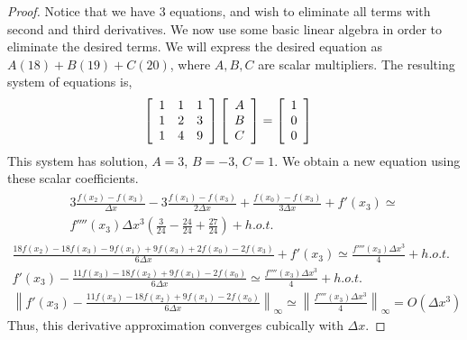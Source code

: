 \documentclass{article}
\begin{document}
\begin{enumerate}
\begin{proof}
        Notice that we have 3 equations, and wish to eliminate all terms with second and third derivatives. We now use some basic linear algebra in order to eliminate the desired terms. We will express the desired equation as $A(18) + B(19) + C(20)$, where $A, B, C$ are scalar multipliers. The resulting system of equations is, 
    \begin{align}
        \left[ \begin{array}{c c c} 1 & 1 & 1 \\ 1 & 2 & 3 \\ 1 & 4 & 9 \end{array} \right] \left[ \begin{array}{c} A  \\ B \\ C\end{array}\right] &= \left[\begin{array}{c} 1 \\ 0 \\ 0\end{array}\right]
    \end{align}
    This system has solution, $A = 3$, $B = -3$, $C = 1$. We obtain a new equation using these scalar coefficients. 
    \begin{align}
        \begin{split}
            3\frac{f(x_2) - f(x_3)}{\Delta x} -3\frac{f(x_1) - f(x_3)}{2\Delta x} +  \frac{f(x_0) - f(x_3)}{3\Delta x} + f'(x_3)  \simeq \\ f''''(x_3)\Delta x^3 \left(\frac{3}{24} -  \frac{24}{24} + \frac{27}{24}\right) + h.o.t. 
        \end{split}
    \end{align}
    \begin{align}
            \frac{18f(x_2) - 18f(x_3) - 9f(x_1) + 9f(x_3) + 2f(x_0) - 2f(x_3)}{6\Delta x} + f'(x_3)  \simeq \frac{f''''(x_3)\Delta x^3}{4} + h.o.t. \\
            f'(x_3) - \frac{11f(x_3) - 18f(x_2)  + 9f(x_1) -  2f(x_0)}{6\Delta x}  \simeq \frac{f''''(x_3)\Delta x^3}{4} + h.o.t. \\
            \left\lVert f'(x_3) - \frac{11f(x_3) - 18f(x_2)  + 9f(x_1) -  2f(x_0)}{6\Delta x}\right\rVert_{\infty} \simeq \left\lVert\frac{f''''(x_3)\Delta x^3}{4}\right\rVert_{\infty} = O(\Delta x^3)
    \end{align}
        Thus, this derivative approximation converges cubically with $\Delta x$.

    \end{proof}
        

\end{enumerate}
\end{document}

